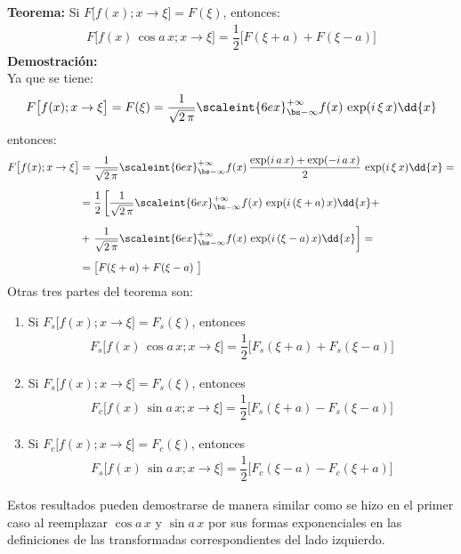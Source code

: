 \textbf{Teorema:} Si $F \big[ f(x); x \to \xi \big] = F(\xi)$, entonces:
\begin{align*}
F \big[ f(x) \, \cos a \, x; x \to \xi \big] = \dfrac{1}{2} \big[F(\xi + a) + F(\xi - a) \big]
\end{align*}
\textbf{Demostración:}
\\
Ya que se tiene:
\begin{align*}
F \big[f(x); x \to \xi \big] = F(\xi) = \dfrac{1}{\sqrt{2 \, \pi}} \scaleint{6ex}_{\bs -\infty}^{+\infty} f(x) \, \exp(i \, \xi \, x) \dd{x}
\end{align*}
entonces:
\begin{align*}
F \big[ f(x); x \to \xi \big] &= \dfrac{1}{\sqrt{2 \, \pi}} \scaleint{6ex}_{\bs -\infty}^{+\infty} f(x) \, \dfrac{\exp(i \, a \, x) + \exp(-i \, a \, x)}{2} \, \exp(i \, \xi \, x) \dd{x} = \\[0.5em]
&= \dfrac{1}{2} \left[ \dfrac{1}{\sqrt{2 \, \pi}} \scaleint{6ex}_{\bs -\infty}^{+\infty} f(x) \, \exp(i \, (\xi + a) \, x)  \dd{x} + \right. \\[0.5em]
&+ \left. \dfrac{1}{\sqrt{2 \, \pi}} \scaleint{6ex}_{\bs -\infty}^{+\infty} f(x) \, \exp(i \, (\xi - a) \, x)  \dd{x} \right] = \\[0.5em]
&= \big[ F(\xi + a) + F (\xi - a) \big]
\end{align*}
Otras tres partes del teorema son:
\begin{enumerate}[label=\alph*)]
\item Si $F_{s} \big[ f(x); x \to \xi \big] = F_{s} (\xi)$, entonces
\begin{align*}
F_{s} \big[ f(x) \, \cos a \, x; x \to \xi \big] = \dfrac{1}{2} \big[ F_{s} (\xi +  a) + F_{s} (\xi - a) \big]
\end{align*}
\item Si $F_{s} \big[ f(x); x \to \xi \big] = F_{s} (\xi)$, entonces
\begin{align*}
F_{c} \big[ f(x) \, \sin a \, x; x \to \xi \big] = \dfrac{1}{2} \big[ F_{s} (\xi +  a) - F_{s} (\xi - a) \big]
\end{align*}
\item Si $F_{c} \big[f(x); x \to \xi \big] = F_{c} (\xi)$, entonces
\begin{align*}
F_{s} \big[f(x) \, \sin a \, x; x \to \xi \big] = \dfrac{1}{2} \big[ F_{c} (\xi -  a) - F_{c} (\xi + a) \big]
\end{align*}
\end{enumerate}
Estos resultados pueden demostrarse de manera similar como se hizo en el primer caso al reemplazar $\cos a \, x$ y $\sin a \, x$ por sus formas exponenciales en las definiciones de las transformadas correspondientes del lado izquierdo.

